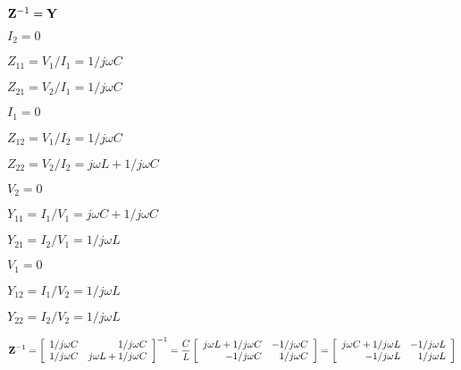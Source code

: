 {\newpage\clearpage
{}%
${\bf Z}^{-1}={\bf Y}$%
\lthtmlinlinemathZ
\lthtmlcheckvsize\clearpage}

{\newpage\clearpage
{}%
$I_2=0$%
\lthtmlinlinemathZ
\lthtmlcheckvsize\clearpage}

{\newpage\clearpage
{}%
$Z_{11}=V_1/I_1=1/j\omega C$%
\lthtmlinlinemathZ
\lthtmlcheckvsize\clearpage}

{\newpage\clearpage
{}%
$Z_{21}=V_2/I_1=1/j\omega C$%
\lthtmlinlinemathZ
\lthtmlcheckvsize\clearpage}

{\newpage\clearpage
{}%
$I_1=0$%
\lthtmlinlinemathZ
\lthtmlcheckvsize\clearpage}

{\newpage\clearpage
{}%
$Z_{12}=V_1/I_2=1/j\omega C$%
\lthtmlinlinemathZ
\lthtmlcheckvsize\clearpage}

{\newpage\clearpage
{}%
$Z_{22}=V_2/I_2=j\omega L+1/j\omega C$%
\lthtmlinlinemathZ
\lthtmlcheckvsize\clearpage}

{\newpage\clearpage
{}%
$V_2=0$%
\lthtmlinlinemathZ
\lthtmlcheckvsize\clearpage}

{\newpage\clearpage
{}%
$Y_{11}=I_1/V_1=j\omega C+1/j\omega C$%
\lthtmlinlinemathZ
\lthtmlcheckvsize\clearpage}

{\newpage\clearpage
{}%
$Y_{21}=I_2/V_1=1/j\omega L$%
\lthtmlinlinemathZ
\lthtmlcheckvsize\clearpage}

{\newpage\clearpage
{}%
$V_1=0$%
\lthtmlinlinemathZ
\lthtmlcheckvsize\clearpage}

{\newpage\clearpage
{}%
$Y_{12}=I_1/V_2=1/j\omega L$%
\lthtmlinlinemathZ
\lthtmlcheckvsize\clearpage}

{\newpage\clearpage
{}%
$Y_{22}=I_2/V_2=1/j\omega L$%
\lthtmlinlinemathZ
\lthtmlcheckvsize\clearpage}

{\newpage\clearpage
{}%
\begin{displaymath} {\bf Z}^{-1}=\left[ \begin{array}{rr} 1/j\omega C & 1/j\omega C \\
  	1/j\omega C & j\omega L+1/j\omega C \end{array} \right]^{-1}
  	=\frac{C}{L}\left[ \begin{array}{rr} j\omega L+1/j\omega C & -1/j\omega C \\
  	-1/j\omega C & 1/j\omega C \end{array} \right]
  	=\left[ \begin{array}{rr} j\omega C+1/j\omega L & -1/j\omega L \\
  	-1/j\omega L & 1/j\omega L \end{array} \right]
  \end{displaymath}%
\lthtmldisplayZ
\lthtmlcheckvsize\clearpage}


